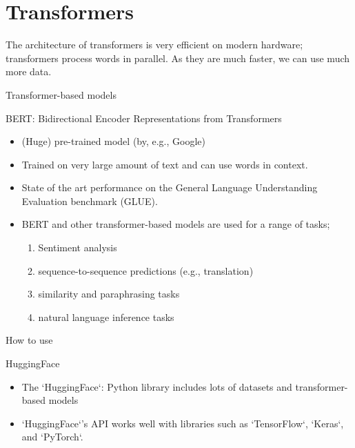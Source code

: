 \documentclass[compress]{beamer}
\begin{document}
\section{Transformers}

\begin{frame}
	The architecture of transformers is very efficient on modern hardware; transformers process words in parallel.
	As they are much faster, we can use much more data. 
\end{frame}

\begin{frame}{Transformer-based models}
	\begin{block}{BERT: Bidirectional Encoder Representations from Transformers \parencite{BERT}}
		\begin{itemize}[<+->]
			\item (Huge) pre-trained model (by, e.g., Google) 
			\item Trained on very large amount of text and can use words in context. 
			\item State of the art performance on the General Language Understanding Evaluation benchmark (GLUE). 
			\item BERT and other transformer-based models are used for a range of tasks;
			\begin{enumerate}
				\item Sentiment analysis
				\item sequence-to-sequence predictions (e.g., translation)
				\item similarity and paraphrasing tasks
				\item natural language inference tasks
		\end{enumerate}
	\end{itemize}
	\end{block}
\end{frame}

\begin{frame}{How to use}
	\begin{block}{HuggingFace}
		\begin{itemize}[<+->]
			\item The `HuggingFace`: Python library includes lots of datasets and transformer-based models 
			\item `HuggingFace`'s API works well with libraries such as `TensorFlow`, `Keras`, and `PyTorch`. 
		\end{itemize}
	\end{block}
\end{frame}
\end{document}
